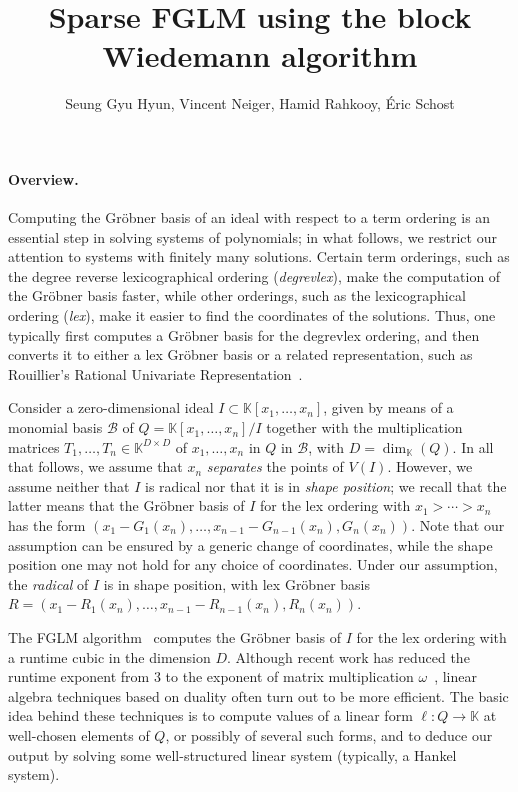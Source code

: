 \documentclass[12pt]{article}
\title{Sparse FGLM using the block Wiedemann algorithm}
\author{Seung Gyu Hyun, Vincent Neiger, Hamid Rahkooy, \' Eric Schost}
\begin{document}
\maketitle

\paragraph{Overview.}
Computing the Gr\"obner basis of an ideal with respect to a term
ordering is an essential step in solving systems of polynomials; in
what follows, we restrict our attention to systems with finitely many
solutions. Certain term orderings, such as the degree reverse
lexicographical ordering (\emph{degrevlex}), make the computation of the
Gr\"obner basis faster, while other orderings, such as the
lexicographical ordering (\emph{lex}), make it easier to find the coordinates
of the solutions. Thus, one typically first computes a Gr\"obner basis
for the degrevlex ordering, and then converts it to either a lex Gr\"obner
basis or a related representation, such as Rouillier's Rational
Univariate Representation~\cite{Rouillier99}.

Consider a zero-dimensional ideal $I \subset \mathbb{K}[x_1, \dots,
  x_n]$, given by means of a monomial basis $\mathscr{B}$ of
$Q=\mathbb{K}[x_1, \dots, x_n]/I$ together with the multiplication
matrices $T_1,\dots, T_n \in \mathbb{K}^{D \times D}$ of
$x_1,\dots,x_n$ in $Q$ in $\mathscr{B}$, with
$D=\dim_\mathbb{K}(Q)$. In all that follows, we assume that $x_n$ {\em
  separates} the points of $V(I)$. However, we assume neither that $I$
is radical nor that it is in {\em shape position}; we recall that the latter means that the
Gr\"obner basis of $I$ for the lex ordering with $x_1 > \cdots > x_n$ has the form
$(x_1-G_1(x_n),\dots,x_{n-1}-G_{n-1}(x_n),G_n(x_n))$. Note that our
assumption can be ensured by a generic change of coordinates, while
the shape position one may not hold for any choice of
coordinates. Under our assumption, the {\em radical} of $I$ is in
shape position, with lex Gr\"obner basis
$R=(x_1-R_1(x_n),\dots,x_{n-1}-R_{n-1}(x_n),R_n(x_n))$.

The FGLM algorithm~\cite{FaGiLaMo93} computes the Gr\"obner basis of
$I$ for the lex ordering with a runtime cubic in the dimension
$D$. Although recent work has reduced the runtime exponent from $3$ to
the exponent of matrix multiplication
$\omega$~\cite{FaGaHuRe13,Neiger16}, linear algebra techniques based
on duality often turn out to be more efficient. The basic idea behind
these techniques is to compute values of a
linear form $\ell: Q \to \mathbb{K}$ at well-chosen elements of $Q$,
or possibly of several such forms,
and to deduce our output by solving some well-structured linear system
(typically, a Hankel system).
\end{document}
